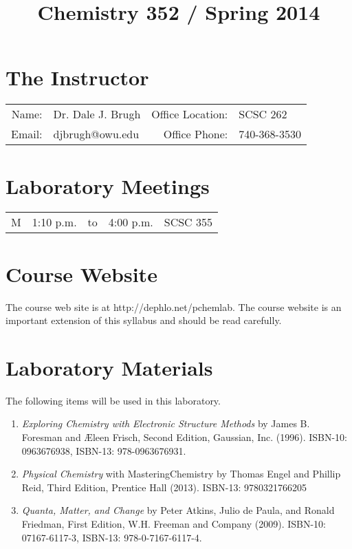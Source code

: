 \documentclass[letterpaper,oneside,onecolumn,11pt,article]{memoir}
\title{Chemistry 352 / Spring 2014}
\date{}
\author{}
\begin{document}
\maketitle
\thispagestyle{courseinformationtitle}

\section{The Instructor}
\begin{tabular}{rl|rl}
Name: & Dr. Dale J. Brugh & Office Location: & SCSC 262 \\
Email: & djbrugh@owu.edu & Office Phone: & 740-368-3530 \\
\end{tabular}

\section{Laboratory Meetings}
\begin{tabular}{crcrl}
M & 1:10 p.m. & to & 4:00 p.m. & SCSC 355 \\
\end{tabular}

\section{Course Website}
The course web site is at http://dephlo.net/pchemlab. The course website is an important extension of this syllabus and should be read carefully. 

\section{Laboratory Materials}
The following items will be used in this laboratory. 
\begin{enumerate}
\item \textit{Exploring Chemistry with Electronic Structure Methods} by James B. Foresman and \AE leen Frisch, Second Edition, Gaussian, Inc. (1996). ISBN-10: 0963676938, ISBN-13: 978-0963676931.
\item \emph{Physical Chemistry} with MasteringChemistry by Thomas Engel and Phillip Reid, Third Edition, Prentice Hall (2013).  ISBN-13: 9780321766205
\item \emph{Quanta, Matter, and Change} by Peter Atkins, Julio de Paula, and Ronald Friedman, First Edition, W.H. Freeman and Company (2009). ISBN-10: 07167-6117-3, ISBN-13: 978-0-7167-6117-4.
\end{enumerate}
\end{document}
